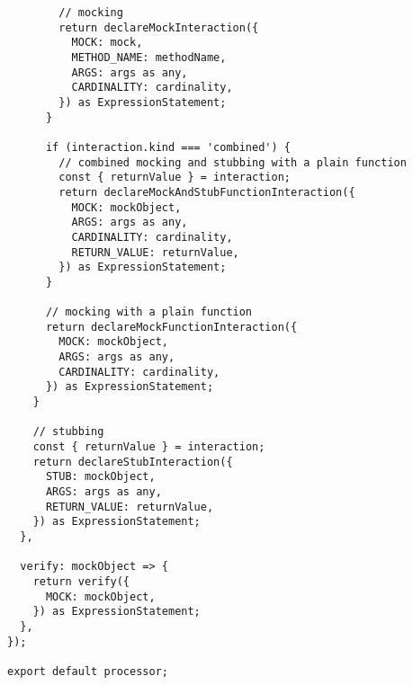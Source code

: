 \begin{verbatim}
        // mocking
        return declareMockInteraction({
          MOCK: mock,
          METHOD_NAME: methodName,
          ARGS: args as any,
          CARDINALITY: cardinality,
        }) as ExpressionStatement;
      }

      if (interaction.kind === 'combined') {
        // combined mocking and stubbing with a plain function
        const { returnValue } = interaction;
        return declareMockAndStubFunctionInteraction({
          MOCK: mockObject,
          ARGS: args as any,
          CARDINALITY: cardinality,
          RETURN_VALUE: returnValue,
        }) as ExpressionStatement;
      }

      // mocking with a plain function
      return declareMockFunctionInteraction({
        MOCK: mockObject,
        ARGS: args as any,
        CARDINALITY: cardinality,
      }) as ExpressionStatement;
    }

    // stubbing
    const { returnValue } = interaction;
    return declareStubInteraction({
      STUB: mockObject,
      ARGS: args as any,
      RETURN_VALUE: returnValue,
    }) as ExpressionStatement;
  },

  verify: mockObject => {
    return verify({
      MOCK: mockObject,
    }) as ExpressionStatement;
  },
});

export default processor;
\end{verbatim}

